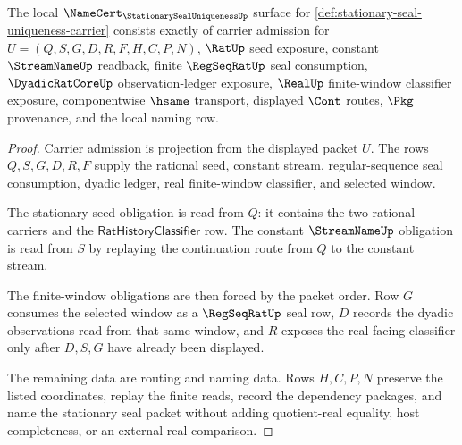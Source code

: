 \begin{theorem}
\label{thm:stationary-seal-uniqueness-namecert-obligations}
The local $\NameCert_{\StationarySealUniquenessUp}$ surface for \autoref{def:stationary-seal-uniqueness-carrier} consists exactly of carrier admission for $U=(Q,S,G,D,R,F,H,C,P,N)$, $\RatUp$ seed exposure, constant $\StreamNameUp$ readback, finite $\RegSeqRatUp$ seal consumption, $\DyadicRatCoreUp$ observation-ledger exposure, $\RealUp$ finite-window classifier exposure, componentwise $\hsame$ transport, displayed $\Cont$ routes, $\Pkg$ provenance, and the local naming row.
\end{theorem}
\begin{proof}
Carrier admission is projection from the displayed packet $U$. The rows $Q,S,G,D,R,F$ supply the rational seed, constant stream, regular-sequence seal consumption, dyadic ledger, real finite-window classifier, and selected window.

The stationary seed obligation is read from $Q$: it contains the two rational carriers and the $\mathsf{RatHistoryClassifier}$ row. The constant $\StreamNameUp$ obligation is read from $S$ by replaying the continuation route from $Q$ to the constant stream.

The finite-window obligations are then forced by the packet order. Row $G$ consumes the selected window as a $\RegSeqRatUp$ seal row, $D$ records the dyadic observations read from that same window, and $R$ exposes the real-facing classifier only after $D,S,G$ have already been displayed.

The remaining data are routing and naming data. Rows $H,C,P,N$ preserve the listed coordinates, replay the finite reads, record the dependency packages, and name the stationary seal packet without adding quotient-real equality, host completeness, or an external real comparison.
\end{proof}

